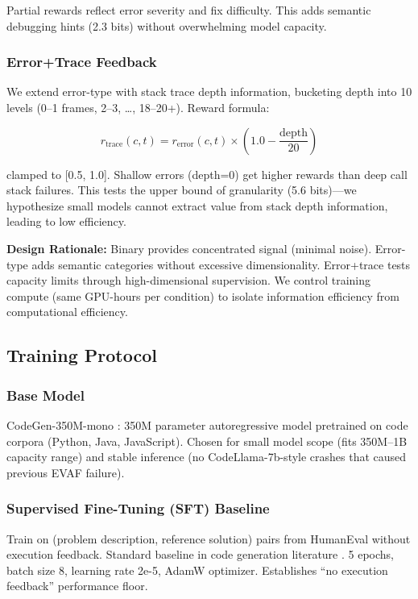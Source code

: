 Partial rewards reflect error severity and fix difficulty. This adds semantic debugging hints (2.3 bits) without overwhelming model capacity.

\subsubsection{Error+Trace Feedback}

We extend error-type with stack trace depth information, bucketing depth into 10 levels (0--1 frames, 2--3, \ldots, 18--20+). Reward formula:

\begin{equation}
r_{\text{trace}}(c, t) = r_{\text{error}}(c, t) \times \left(1.0 - \frac{\text{depth}}{20}\right)
\end{equation}

clamped to [0.5, 1.0]. Shallow errors (depth=0) get higher rewards than deep call stack failures. This tests the upper bound of granularity (5.6 bits)---we hypothesize small models cannot extract value from stack depth information, leading to low efficiency.

\textbf{Design Rationale:} Binary provides concentrated signal (minimal noise). Error-type adds semantic categories without excessive dimensionality. Error+trace tests capacity limits through high-dimensional supervision. We control training compute (same GPU-hours per condition) to isolate information efficiency from computational efficiency.

\subsection{Training Protocol}

\subsubsection{Base Model}

CodeGen-350M-mono \cite{nijkamp2023codegen}: 350M parameter autoregressive model pretrained on code corpora (Python, Java, JavaScript). Chosen for small model scope (fits 350M--1B capacity range) and stable inference (no CodeLlama-7b-style crashes that caused previous EVAF failure).

\subsubsection{Supervised Fine-Tuning (SFT) Baseline}

Train on (problem description, reference solution) pairs from HumanEval without execution feedback. Standard baseline in code generation literature \cite{le2022coderl,cho2025cocos}. 5 epochs, batch size 8, learning rate 2e-5, AdamW optimizer. Establishes ``no execution feedback'' performance floor.

